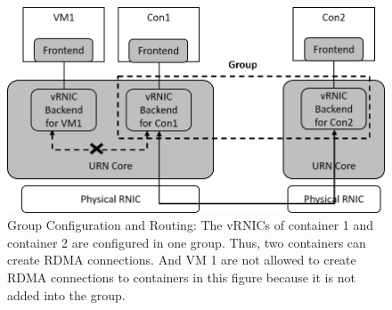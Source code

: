 






\begin{figure}[!ht]
	\centering
	\includegraphics[width=1.0\linewidth]{images/route-config}
	\caption{Group Configuration and Routing: The vRNICs of container 1 and container 2 are configured in one group. Thus, two containers can create RDMA connections. And VM 1 are not allowed to create RDMA connections to containers in this figure because it is not added into the group. }
	\label{fig:route-config}
\end{figure}


